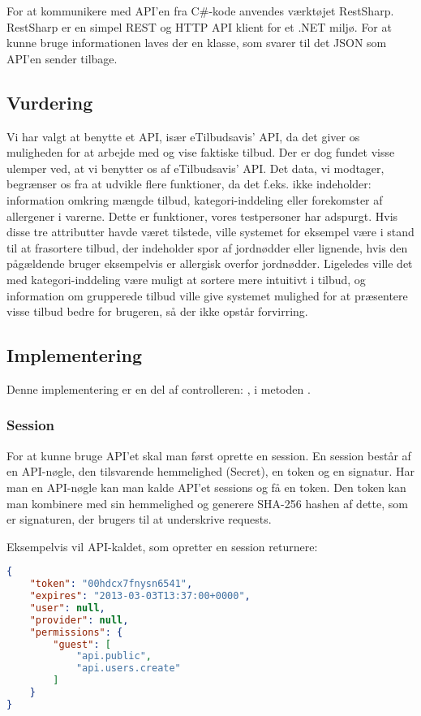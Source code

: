 For at kommunikere med API'en fra C\#-kode anvendes værktøjet RestSharp. RestSharp er en simpel REST og HTTP API klient for et .NET miljø. \citep{RestSharp}
For at kunne bruge informationen laves der en klasse, som svarer til det JSON som API'en sender tilbage.

\subsection{Vurdering}\label{api:skoddata}
Vi har valgt at benytte et API, især eTilbudsavis' API, da det giver os muligheden for at arbejde med og vise faktiske tilbud.
Der er dog fundet visse ulemper ved, at vi benytter os af eTilbudsavis' API.
Det data, vi modtager, begrænser os fra at udvikle flere funktioner, da det f.eks. ikke indeholder: information omkring mængde tilbud, kategori-inddeling eller forekomster af allergener i varerne. 
Dette er funktioner, vores testpersoner har adspurgt. 
Hvis disse tre attributter havde været tilstede, ville systemet for eksempel være i stand til at frasortere tilbud, der indeholder spor af jordnødder eller lignende, hvis den pågældende bruger eksempelvis er allergisk overfor jordnødder. 
Ligeledes ville det med kategori-inddeling være muligt at sortere mere intuitivt i tilbud, og information om grupperede tilbud ville give systemet mulighed for at præsentere visse tilbud bedre for brugeren, så der ikke opstår forvirring.

\subsection{Implementering}
Denne implementering er en del af controlleren: , i metoden .
\subsubsection{Session}
For at kunne bruge API'et skal man først oprette en session.
En session består af en API-nøgle, den tilsvarende hemmelighed (Secret), en token og en signatur.
Har man en API-nøgle kan man kalde API'et sessions og få en token.
Den token kan man kombinere med sin hemmelighed og generere SHA-256 hashen af dette, som er signaturen, der brugers til at underskrive requests.

Eksempelvis vil API-kaldet, som opretter en session returnere:
\begin{lstlisting}[language=json,firstnumber=1,caption={POST til sessions API'et med APIKEY'en},label=apilst1]
{
    "token": "00hdcx7fnysn6541",
    "expires": "2013-03-03T13:37:00+0000",
    "user": null,
    "provider": null,
    "permissions": {
        "guest": [
            "api.public",
            "api.users.create"
        ]
    }
}
\end{lstlisting}

